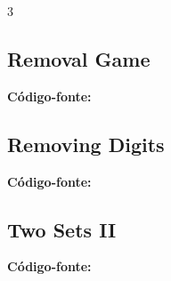 \documentclass[8pt]{extarticle}
\begin{document}
\begin{multicols*}{3}
\subsection{Removal Game}
\begin{caixaenunciado}

\end{caixaenunciado}
\vspace{0.3cm}
\noindent\textbf{Código-fonte:}


\subsection{Removing Digits}
\begin{caixaenunciado}

\end{caixaenunciado}
\vspace{0.3cm}
\noindent\textbf{Código-fonte:}


\subsection{Two Sets II}
\begin{caixaenunciado}

\end{caixaenunciado}
\vspace{0.3cm}
\noindent\textbf{Código-fonte:}

\end{multicols*}
\pagebreak
\end{document}
